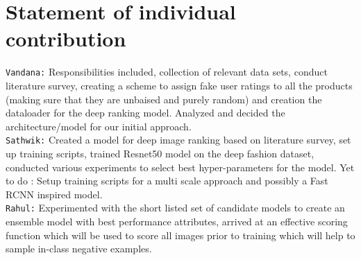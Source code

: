 \section{Statement of individual contribution}
\texttt{Vandana:} Responsibilities included, collection of relevant data sets, conduct literature survey, creating a scheme to assign fake user ratings to all the products (making sure that they are unbaised and purely random) and creation the dataloader for the deep ranking model. Analyzed and decided the architecture/model for our initial approach. 
\\

\noindent \texttt{Sathwik:} Created a model for deep image ranking based on literature survey, set up training scripts, trained Resnet50 model on the deep fashion dataset, conducted various experiments to select best hyper-parameters for the model. Yet to do : Setup training scripts for a multi scale approach and possibly a Fast RCNN inspired model. 
\\

\noindent \texttt{Rahul:} Experimented with the short listed set of candidate models to create an ensemble model with best performance attributes, arrived at an effective scoring function which will be used to score all images prior to training which will help to sample in-class negative examples.